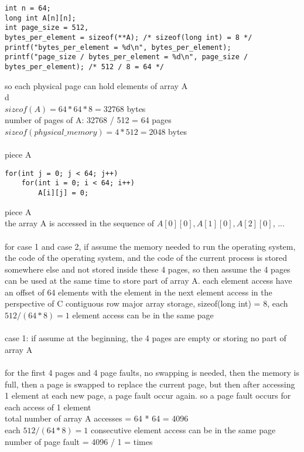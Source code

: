\documentclass[12pt, border = 4pt, multi]{article} %
\begin{document}
\begin{lstlisting}
int n = 64;
long int A[n][n];
int page_size = 512,
bytes_per_element = sizeof(**A); /* sizeof(long int) = 8 */
printf("bytes_per_element = %d\n", bytes_per_element);
printf("page_size / bytes_per_element = %d\n", page_size / bytes_per_element); /* 512 / 8 = 64 */
\end{lstlisting}
so each physical page can hold  elements of array A\\
\newpage
\noindent
d\\
$sizeof(A) = 64 * 64 * 8 = 32768$ bytes\\
number of pages of A: 32768 / 512 = 64 pages\\
$sizeof(physical\_memory) = 4 * 512 = 2048$ bytes\\
\\
piece A
\begin{lstlisting}
for(int j = 0; j < 64; j++)
    for(int i = 0; i < 64; i++)
        A[i][j] = 0;
\end{lstlisting}
piece A\\
the array A is accessed in the sequence of $A[0][0], A[1][0], A[2][0]$, ...\\
\\
for case 1 and case 2, if assume the memory needed to run the operating system, the code of the operating system, and the code of the current process is stored somewhere else and not stored inside these 4 pages, so then assume the 4 pages can be used at the same time to store part of array A. each element access have an offset of 64 elements with the element in the next element access in the perspective of C contiguous row major array storage, sizeof(long int) = 8, each $512 / (64 * 8) = 1$ element access can be in the same page\\
\\
case 1: if assume at the beginning, the 4 pages are empty or storing no part of array A\\
\\
for the first 4 pages and 4 page faults, no swapping is needed, then the memory is full, then a page is swapped to replace the current page, but then after accessing 1 element at each new page, a page fault occur again. so a page fault occurs for each access of 1 element\\
total number of array A accesses = 64 * 64 = 4096\\
each $512 / (64 * 8) = 1$ consecutive element access can be in the same page\\
number of page fault = 4096 / 1 =  times\\
\end{document}
